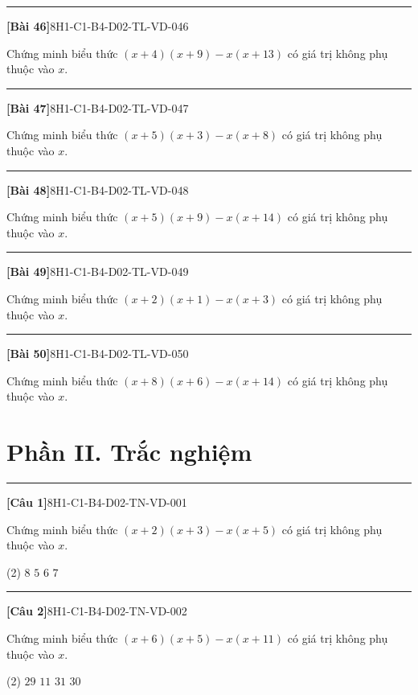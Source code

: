 \documentclass[12pt,a4paper]{article}
\newif\ifloigiai
\newenvironment{cauhoi}[2]{%
  \par\medskip\noindent\rule{\textwidth}{0.4pt}\par\nopagebreak
  \noindent\textbf{[#1]}\hfill{\scriptsize\ttfamily #2}\par\nopagebreak\smallskip}{\par}
\newcommand{\loigiai}[1]{\ifloigiai\par\smallskip\noindent\textit{Lời giải.} #1\par\fi}
\newcommand{\dapan}[1]{\ifloigiai\par\smallskip\noindent\textit{Đáp án:} \textbf{#1}\par\fi}
\begin{document}
\begin{cauhoi}{Bài 46}{8H1-C1-B4-D02-TL-VD-046}
Chứng minh biểu thức $(x+4)(x+9)-x(x+13)$ có giá trị không phụ thuộc vào $x$.
\loigiai{$(x+4)(x+9)-x(x+13)=x^{2}+4x+9x+36-x^{2}-13x=36$. Kết quả là hằng số nên biểu thức không phụ thuộc vào $x$.}
\end{cauhoi}
\begin{cauhoi}{Bài 47}{8H1-C1-B4-D02-TL-VD-047}
Chứng minh biểu thức $(x+5)(x+3)-x(x+8)$ có giá trị không phụ thuộc vào $x$.
\loigiai{$(x+5)(x+3)-x(x+8)=x^{2}+5x+3x+15-x^{2}-8x=15$. Kết quả là hằng số nên biểu thức không phụ thuộc vào $x$.}
\end{cauhoi}
\begin{cauhoi}{Bài 48}{8H1-C1-B4-D02-TL-VD-048}
Chứng minh biểu thức $(x+5)(x+9)-x(x+14)$ có giá trị không phụ thuộc vào $x$.
\loigiai{$(x+5)(x+9)-x(x+14)=x^{2}+5x+9x+45-x^{2}-14x=45$. Kết quả là hằng số nên biểu thức không phụ thuộc vào $x$.}
\end{cauhoi}
\begin{cauhoi}{Bài 49}{8H1-C1-B4-D02-TL-VD-049}
Chứng minh biểu thức $(x+2)(x+1)-x(x+3)$ có giá trị không phụ thuộc vào $x$.
\loigiai{$(x+2)(x+1)-x(x+3)=x^{2}+2x+x+2-x^{2}-3x=2$. Kết quả là hằng số nên biểu thức không phụ thuộc vào $x$.}
\end{cauhoi}
\begin{cauhoi}{Bài 50}{8H1-C1-B4-D02-TL-VD-050}
Chứng minh biểu thức $(x+8)(x+6)-x(x+14)$ có giá trị không phụ thuộc vào $x$.
\loigiai{$(x+8)(x+6)-x(x+14)=x^{2}+8x+6x+48-x^{2}-14x=48$. Kết quả là hằng số nên biểu thức không phụ thuộc vào $x$.}
\end{cauhoi}
\clearpage\section*{Phần II. Trắc nghiệm}
\begin{cauhoi}{Câu 1}{8H1-C1-B4-D02-TN-VD-001}
Chứng minh biểu thức $(x+2)(x+3)-x(x+5)$ có giá trị không phụ thuộc vào $x$.
\begin{tasks}(2)
\task $8$
\task $5$
\task $6$
\task $7$
\end{tasks}
\dapan{C}
\end{cauhoi}
\begin{cauhoi}{Câu 2}{8H1-C1-B4-D02-TN-VD-002}
Chứng minh biểu thức $(x+6)(x+5)-x(x+11)$ có giá trị không phụ thuộc vào $x$.
\begin{tasks}(2)
\task $29$
\task $11$
\task $31$
\task $30$
\end{tasks}
\dapan{D}
\end{cauhoi}
\end{document}
